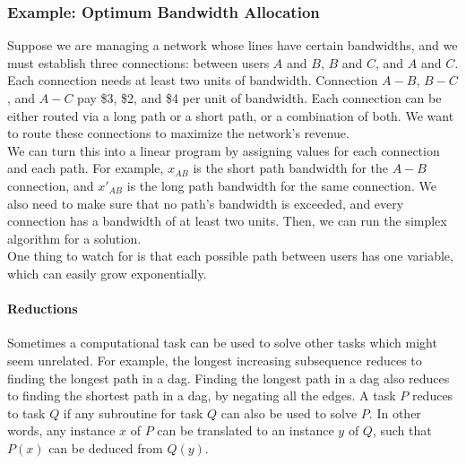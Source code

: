 \subsubsection{Example: Optimum Bandwidth Allocation}
Suppose we are managing a network whose lines have certain bandwidths, and we must establish three connections: between users $A$ and $B$, $B$ and $C$, and $A$ and $C$.
Each connection needs at least two units of bandwidth.
Connection $A-B$, $B-C$, and $A-C$ pay \$3, \$2, and \$4 per unit of bandwidth.
Each connection can be either routed via a long path or a short path, or a combination of both.
We want to route these connections to maximize the network's revenue.\\
We can turn this into a linear program by assigning values for each connection and each path.
For example, $x_{AB}$ is the short path bandwidth for the $A-B$ connection, and ${x'}_{AB}$ is the long path bandwidth for the same connection.
We also need to make sure that no path's bandwidth is exceeded, and every connection has a bandwidth of at least two units.
Then, we can run the simplex algorithm for a solution.\\
One thing to watch for is that each possible path between users has one variable, which can easily grow exponentially.

\paragraph{Reductions}
Sometimes a computational task can be used to solve other tasks which might seem unrelated.
For example, the longest increasing subsequence reduces to finding the longest path in a dag.
Finding the longest path in a dag also reduces to finding the shortest path in a dag, by negating all the edges.
A task $P$ reduces to task $Q$ if any subroutine for task $Q$ can also be used to solve $P$.
In other words, any instance $x$ of $P$ can be translated to an instance $y$ of $Q$, such that $P(x)$ can be deduced from $Q(y)$.

